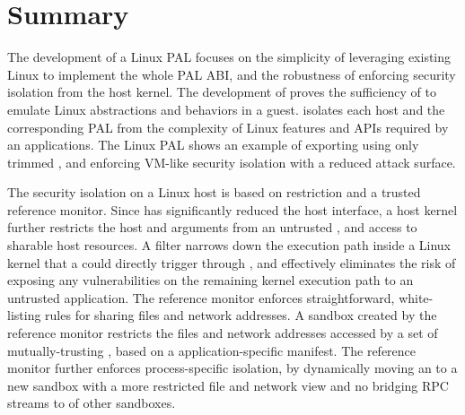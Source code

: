 \section{Summary}


The development of a Linux PAL focuses
on the simplicity of leveraging existing Linux \linuxapis{} to implement
the whole PAL ABI,
and the robustness of enforcing security isolation
from the host kernel.
The development of \thelibos{} proves the sufficiency of \thehostabi{} to emulate Linux abstractions and behaviors in a guest.
\Thehostabi{} isolates each host
and the corresponding PAL
from the complexity of Linux features and APIs required by an applications.
The Linux PAL
shows an example of exporting \thehostabi{} using only \hostsyscallnum{} trimmed \linuxapis{},
and enforcing VM-like security isolation
with a reduced attack surface.


The security isolation on a Linux host is based on \linuxapi{} restriction and a trusted reference monitor.
Since \thelibos{} has significantly reduced the host interface,
a host kernel further restricts the host \linuxapis{} and arguments from an untrusted \picoproc{},
and access to sharable host resources.
A \seccomp{} filter
narrows down the execution path inside a Linux kernel that a \picoproc{} could directly trigger through \linuxapis{},
and effectively eliminates
the risk of exposing any vulnerabilities on the remaining kernel execution path to an untrusted application.
The reference monitor enforces straightforward, white-listing rules
for sharing files and network addresses.
A sandbox created by the reference monitor restricts
the files and network addresses accessed by a set of mutually-trusting \picoproc{}, based on a application-specific manifest.
The reference monitor further enforces process-specific isolation,
by dynamically moving an \picoproc{} to a new sandbox
with a more restricted file and network view and no bridging RPC streams to \picoprocs{} of other sandboxes.





